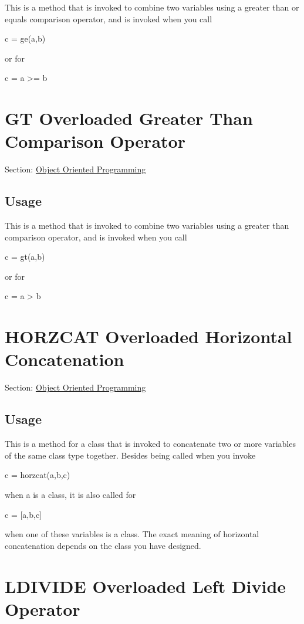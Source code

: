 This is a method that is invoked to combine two variables using a greater than or equals comparison operator, and is invoked when you call \begin{DoxyVerb}   c = ge(a,b)
\end{DoxyVerb}
 or for \begin{DoxyVerb}   c = a >= b
\end{DoxyVerb}
 \hypertarget{class_gt}{}\section{G\-T Overloaded Greater Than Comparison Operator}\label{class_gt}
Section\-: \hyperlink{sec_class}{Object Oriented Programming} \hypertarget{vtkwidgets_vtkxyplotwidget_Usage}{}\subsection{Usage}\label{vtkwidgets_vtkxyplotwidget_Usage}
This is a method that is invoked to combine two variables using a greater than comparison operator, and is invoked when you call \begin{DoxyVerb}   c = gt(a,b)
\end{DoxyVerb}
 or for \begin{DoxyVerb}   c = a > b
\end{DoxyVerb}
 \hypertarget{class_horzcat}{}\section{H\-O\-R\-Z\-C\-A\-T Overloaded Horizontal Concatenation}\label{class_horzcat}
Section\-: \hyperlink{sec_class}{Object Oriented Programming} \hypertarget{vtkwidgets_vtkxyplotwidget_Usage}{}\subsection{Usage}\label{vtkwidgets_vtkxyplotwidget_Usage}
This is a method for a class that is invoked to concatenate two or more variables of the same class type together. Besides being called when you invoke \begin{DoxyVerb}   c = horzcat(a,b,c)
\end{DoxyVerb}
 when {\ttfamily a} is a class, it is also called for \begin{DoxyVerb}   c = [a,b,c]
\end{DoxyVerb}
 when one of these variables is a class. The exact meaning of horizontal concatenation depends on the class you have designed. \hypertarget{class_ldivide}{}\section{L\-D\-I\-V\-I\-D\-E Overloaded Left Divide Operator}\label{class_ldivide}
